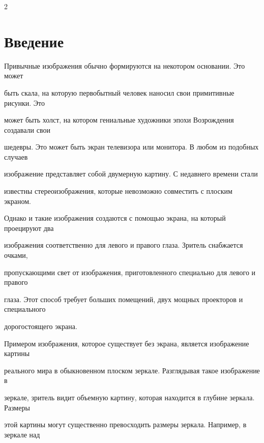       \begin{multicols}{2}



      \label{st\stat}

      


   

\section{Введение}



        \vspace*{-3pt}

  

  Привычные изображения обычно формируются на некотором основании. Это может 

быть скала, на которую первобытный человек наносил свои примитивные рисунки. Это 

может быть холст, на котором гениальные художники эпохи Возрождения создавали свои 

шедевры. Это может быть экран телевизора или монитора. В любом из подобных случаев 

изображение представляет собой двумерную картину. С недавнего времени стали 

известны стереоизображения, которые невозможно совместить с плоским экраном. 

Однако и такие изображения создаются с помощью экрана, на который проецируют два 

изображения соответственно для левого и правого глаза. Зритель снабжается очками, 

пропускающими  свет от изображения, приготовленного специально для левого и правого 

глаза. Этот способ требует больших помещений, двух мощных проекторов и специального 

дорогостоящего экрана. 

  

  Примером изображения, которое существует без экрана, является изображение картины 

реального мира в обыкновенном плоском зеркале. Разглядывая такое изображение в 

зеркале, зритель видит объемную картину, которая находится в глубине зеркала. Размеры 

этой картины могут существенно превосходить размеры зеркала. Например, в зеркале над 


\end{multicols}
